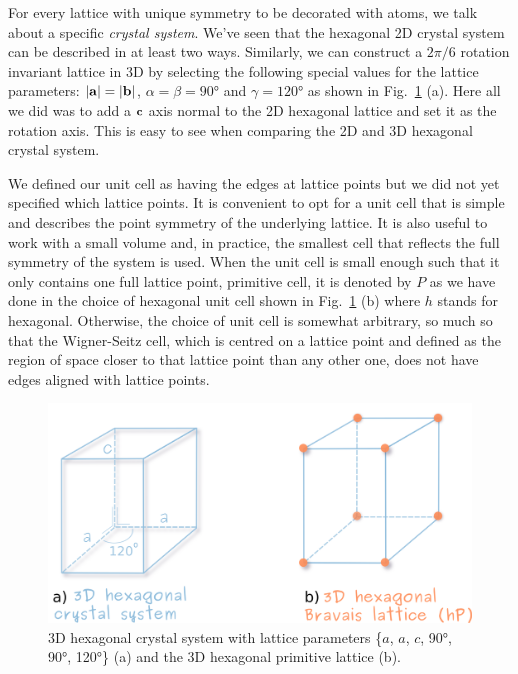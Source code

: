 For every lattice with unique symmetry to be decorated with atoms, we talk about a specific \textit{crystal system}. We've seen that the hexagonal 2D crystal system can be described in at least two ways. Similarly, we can construct a $2\pi/6$ rotation invariant lattice in 3D by selecting the following special values for the lattice parameters:  $|\vb{a}|=|\vb{b}|$, $\alpha = \beta = 90\si{\degree}$ and $\gamma=120\si{\degree}$ as shown in Fig.~\ref{Fig:hex3lattice} (a). Here all we did was to add a $\vb{c}$ axis normal to the 2D hexagonal lattice and set it as the rotation axis. This is easy to see when comparing the 2D and 3D hexagonal crystal system.
 
We defined our unit cell as having the edges at lattice points but we did not yet specified which lattice points. It is convenient to opt for a unit cell that is simple and describes the point symmetry of the underlying lattice. It is also useful to work with a small volume and, in practice, the smallest cell that reflects the full symmetry of the system is used. When the unit cell is small enough such that it only contains one full lattice point, \ie primitive cell, it is denoted by $P$ as we have done in the choice of hexagonal unit cell shown in Fig.~\ref{Fig:hex3lattice} (b) where $h$ stands for hexagonal. Otherwise, the choice of unit cell is somewhat arbitrary, so much so that the Wigner-Seitz cell, which is centred on a lattice point and defined as the region of space closer to that lattice point than any other one, does not have edges aligned with lattice points. 


 
\begin{figure}[htb]
\centering
\includegraphics[width=0.7\linewidth]{Figures/hex3Dlattice.png}
\caption[3D hexagonal crystal system.]{3D hexagonal crystal system  with lattice parameters \{$a$, $a$, $c$, 90\si{\degree}, 90\si{\degree}, 120\si{\degree}\} (a) and the 3D hexagonal primitive lattice (b).  }
\label{Fig:hex3lattice}
\end{figure}



